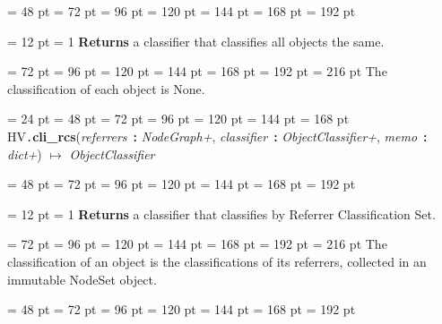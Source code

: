 {{{{\par \noindent  \leftskip = 48 pt  \leftmargini = 72 pt  \leftmarginii = 96 pt  \leftmarginiii = 120 pt  \leftmarginiv = 144 pt  \leftmarginv = 168 pt  \leftmarginvi = 192 pt {\par \noindent
{\par \pagebreak[3.100000] \noindent \hangindent = 12 pt \hangafter = 1 
{\bf Returns \/} a classifier that classifies all objects the same.\par}
{\par \noindent  \leftskip = 72 pt  \leftmargini = 96 pt  \leftmarginii = 120 pt  \leftmarginiii = 144 pt  \leftmarginiv = 168 pt  \leftmarginv = 192 pt  \leftmarginvi = 216 pt  The classification of each object is None.
\par}
\par}
\par}
\par}
\par}
{\par \noindent  \leftskip = 24 pt  \leftmargini = 48 pt  \leftmarginii = 72 pt  \leftmarginiii = 96 pt  \leftmarginiv = 120 pt  \leftmarginv = 144 pt  \leftmarginvi = 168 pt HV{\tt .\/}{\bf {\large {\bf cli{\_}rcs\/}}\/}({\em referrers\/}~{\bf :}  {\em NodeGraph+\/}, {\em classifier\/}~{\bf :}  {\em ObjectClassifier+\/}, {\em memo\/}~{\bf :}  {\em dict+\/}) \(\mapsto \)  {\em ObjectClassifier\/}{\par \noindent
{\par \noindent  \leftskip = 48 pt  \leftmargini = 72 pt  \leftmarginii = 96 pt  \leftmarginiii = 120 pt  \leftmarginiv = 144 pt  \leftmarginv = 168 pt  \leftmarginvi = 192 pt {\par \noindent
{\par \pagebreak[3.100000] \noindent \hangindent = 12 pt \hangafter = 1 
{\bf Returns \/} a classifier that classifies by Referrer Classification Set.\par}
{\par \noindent  \leftskip = 72 pt  \leftmargini = 96 pt  \leftmarginii = 120 pt  \leftmarginiii = 144 pt  \leftmarginiv = 168 pt  \leftmarginv = 192 pt  \leftmarginvi = 216 pt  The classification of an object is the classifications of its
referrers, collected in an immutable NodeSet object.
\par}
\par}
\par}
{\par \noindent  \leftskip = 48 pt  \leftmargini = 72 pt  \leftmarginii = 96 pt  \leftmarginiii = 120 pt  \leftmarginiv = 144 pt  \leftmarginv = 168 pt  \leftmarginvi = 192 pt {\par \noindent
}}}}}
